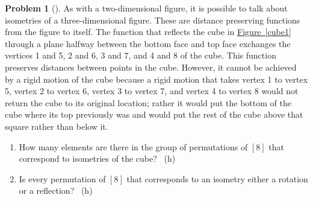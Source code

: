 \documentclass[10pt,]{book}
\theoremstyle{plain}
\theoremstyle{definition}
\newtheorem{activity}[project]{Problem}
\theoremstyle{definition}
\numberwithin{equation}{chapter}
\begin{document}
\begin{activity}[]\marginsymbol[-1em]{} \label{activity-265}
\hypertarget{p-1526}{}%
As with a two-dimensional figure, it is possible to talk about isometries of a three-dimensional figure. These are distance preserving functions from the figure to itself. The function that reflects the cube in \hyperref[cube1]{Figure~\ref{cube1}} through a plane halfway between the bottom face and top face exchanges the vertices 1 and 5, 2 and 6, 3 and 7, and 4 and 8 of the cube. This function preserves distances between points in the cube. However, it cannot be achieved by a rigid motion of the cube because a rigid motion that takes vertex 1 to vertex 5, vertex 2 to vertex 6, vertex 3 to vertex 7, and vertex 4 to vertex 8 would not return the cube to its original location; rather it would put the bottom of the cube where its top previously was and would put the rest of the cube above that square rather than below it.%
\begin{enumerate}[font=\bfseries,label=(\alph*),ref=\alph*]
\item\label{task-197} \marginsymbol[-2.5em]{} \hypertarget{p-1527}{}%
How many elements are there in the group of permutations of \([8]\)   that correspond to isometries of the cube?%
~{\tiny (h)}\item\label{task-198} \marginsymbol[-2.5em]{} \hypertarget{p-1530}{}%
Is every permutation of \([8]\) that corresponds to an isometry either a rotation or a reflection?%
~{\tiny (h)}\end{enumerate}
\end{activity}
\typeout{************************************************}
\typeout{************************************************}
\end{document}
